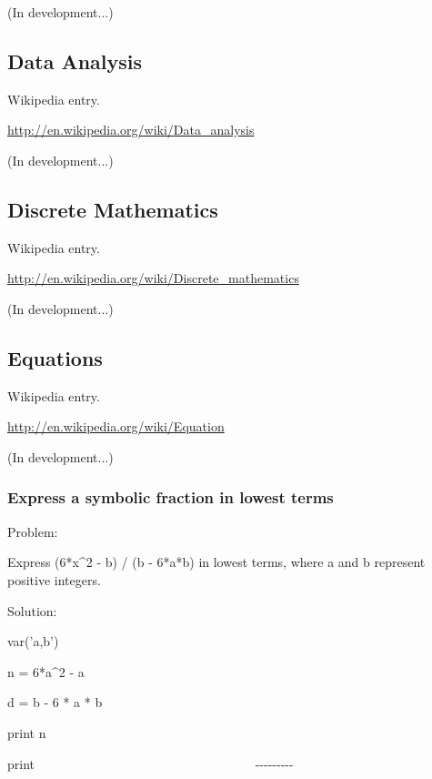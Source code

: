 \documentclass[12pt,oneside]{book}
\begin{document}
(In development...)

\subsection[Data Analysis]{Data Analysis}

Wikipedia entry.

\href{http://en.wikipedia.org/wiki/Data_analysis}{http://en.wikipedia.org/wiki/Data\_analysis}

(In development...)

\subsection[Discrete Mathematics ]{Discrete Mathematics }

Wikipedia entry.

\href{http://en.wikipedia.org/wiki/Discrete_mathematics}{http://en.wikipedia.org/wiki/Discrete\_mathematics}

(In development...)

\subsection[Equations]{Equations}

Wikipedia entry.

\href{http://en.wikipedia.org/wiki/Equation}{http://en.wikipedia.org/wiki/Equation}

(In development...)

\subsubsection[Express a symbolic fraction in lowest terms]{Express a symbolic fraction in lowest terms} 

{\textquotedbl}{\textquotedbl}{\textquotedbl}

Problem:

Express (6*x\^{}2 {}- b) / (b {}- 6*a*b) in lowest terms, where a and b represent positive integers. 

Solution:

{\textquotedbl}{\textquotedbl}{\textquotedbl}


var('a,b')

n = 6*a\^{}2 {}- a

d = b {}- 6 * a * b

print n

print {\textquotedbl}
\ \ \ \ \ \ \ \ \ \ \ \ \ \ \ \ \ \ \ \ \ \ \ \ \ \ \ \ \ \ \ \ \ \ {}-{}-{}-{}-{}-{}-{}-{}-{}-{\textquotedbl}
\end{document}
